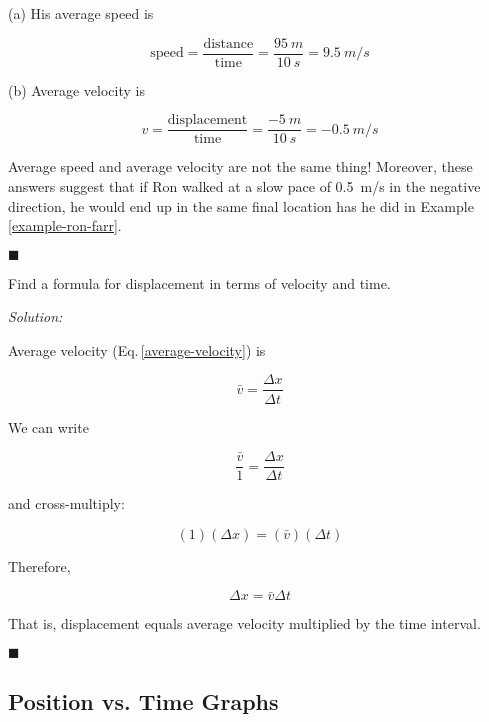 \documentclass[dvipsnames]{article}
\begin{document}
(a) His average speed is

\begin{equation*}
    \text{speed} = \frac{\text{distance}}{\text{time}} = \frac{\SI{95}{m}}{\SI{10}{s}} = \boxed{\SI{9.5}{m/s}}
\end{equation*}

(b) Average velocity is

\begin{equation*}
    v = \frac{\text{displacement}}{\text{time}} = \frac{\SI{-5}{m}}{\SI{10}{s}} = \boxed{\SI{-0.5}{m/s}}
\end{equation*}

Average speed and average velocity are not the same thing! Moreover, these answers suggest that if Ron walked at a slow pace of \SI{0.5}{m/s} in the negative direction, he would end up in the same final location has he did in Example \ref{example-ron-farr}.

\hfill $\blacksquare$

\begin{example}
    Find a formula for displacement in terms of velocity and time.
\end{example}

\textit{Solution:}

Average velocity (Eq.\,\ref{average-velocity}) is

\begin{equation*}
    \bar{v} = \frac{\Delta x}{\Delta t}
\end{equation*}

We can write

\begin{equation*}
    \frac{\bar{v}}{1} = \frac{\Delta x}{\Delta t}
\end{equation*}

and cross-multiply:

\begin{equation*}
    (1)(\Delta x) = (\bar{v})(\Delta t)
\end{equation*}

Therefore,

\begin{equation} \label{displacement2}
    \Delta x = \bar{v} \Delta t
\end{equation}


That is, displacement equals average velocity multiplied by the time interval.

\hfill $\blacksquare$

\subsection{Position vs. Time Graphs}
\end{document}
